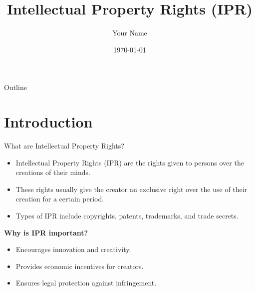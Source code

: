 \documentclass{beamer}
\title{Intellectual Property Rights (IPR)}
\author{Your Name}
\institute{Your Institution}
\date{\today}
\begin{document}
	
	\begin{frame}
		\titlepage
	\end{frame}
	
	\begin{frame}{Outline}
		\tableofcontents
	\end{frame}
	
	\section{Introduction}
	\begin{frame}{What are Intellectual Property Rights?}
		\begin{itemize}
			\item Intellectual Property Rights (IPR) are the rights given to persons over the creations of their minds.
			\item These rights usually give the creator an exclusive right over the use of their creation for a certain period.
			\item Types of IPR include copyrights, patents, trademarks, and trade secrets.
		\end{itemize}
		\vspace{0.5cm}
		\textbf{Why is IPR important?}
		\begin{itemize}
			\item Encourages innovation and creativity.
			\item Provides economic incentives for creators.
			\item Ensures legal protection against infringement.
		\end{itemize}
	\end{frame}
	
\end{document}
